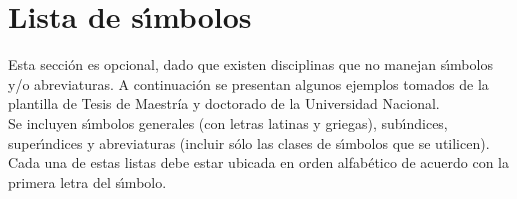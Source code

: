 \chapter*{Lista de s\'{\i}mbolos}
Esta secci\'{o}n es opcional, dado que existen disciplinas que no manejan s\'{\i}mbolos y/o abreviaturas. A continuaci\'on se presentan algunos ejemplos tomados de la plantilla de Tesis de Maestr\'ia y doctorado de la Universidad Nacional.\\

Se incluyen s\'{\i}mbolos generales (con letras latinas y griegas), sub\'{\i}ndices, super\'{\i}ndices y abreviaturas (incluir s\'{o}lo las clases de s\'{\i}mbolos que se utilicen). Cada una de estas listas debe estar ubicada en orden alfab\'{e}tico de acuerdo con la primera letra del s\'{\i}mbolo.
